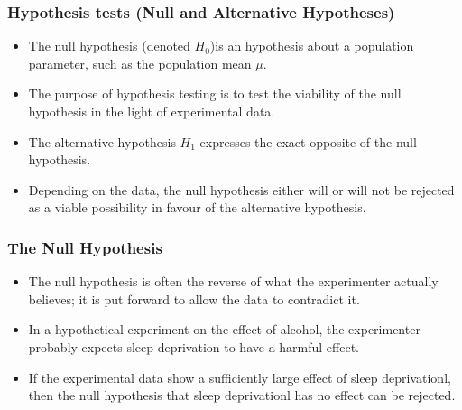 ﻿\documentclass[a4]{beamer}
\begin{document}
\begin{frame}
\frametitle{Hypothesis tests (Null and Alternative Hypotheses) }
\large
\begin{itemize}
\item The null hypothesis (denoted $H_0$)is an hypothesis about a population parameter, such as the population mean $\mu$. \item The purpose of hypothesis testing is to test the viability of the null hypothesis in the light of experimental data. \item The alternative hypothesis $H_1$ expresses the exact opposite of the null hypothesis. \item Depending on the data, the null hypothesis either will or will not be rejected as a viable possibility in favour of the alternative hypothesis. 
\end{itemize}

\end{frame}


\begin{frame}
\frametitle{The Null  Hypothesis }
\large
\begin{itemize}\item 
The null hypothesis is often the reverse of what the experimenter actually believes; it is put forward to allow the data to contradict it. \item In a hypothetical experiment on the effect of alcohol, the experimenter probably expects sleep deprivation to have a harmful effect. \item If the experimental data show a sufficiently large effect of sleep deprivationl, then the null hypothesis that sleep deprivationl has no effect can be rejected. 
\end{itemize}
\end{frame}

\end{document}
